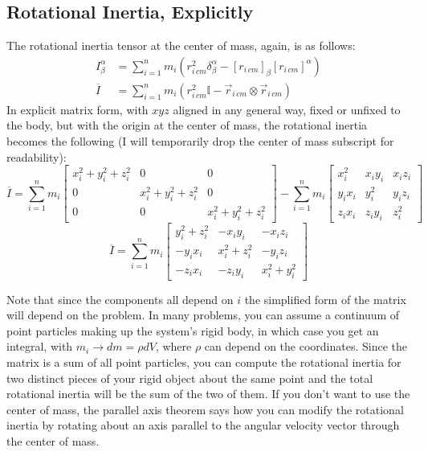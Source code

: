 \documentclass[10pt]{article}
\begin{document}
\subsection{Rotational Inertia, Explicitly}

The rotational inertia tensor at the center of mass, again, is as follows:
\begin{align*}
    I^\alpha_\beta &= \sum_{i=1}^n m_i(r^2_{i\,cm}\delta^\alpha_\beta - 
            [r_{i\,cm}]_\beta[r_{i\,cm}]^\alpha) \\
    \overline{I} &= \sum_{i=1}^n m_i (r^2_{i\,cm}\mathbb{I} - 
        \vec{r}_{i\,cm}\otimes\vec{r}_{i\,cm})
\end{align*}
In explicit matrix form, with $xyz$ aligned in any general way, fixed or 
unfixed to the body, but with the origin at the center of mass, the 
rotational inertia becomes the following (I will temporarily drop 
the center of mass subscript for readability):
\[
\overline{I} = \sum_{i=1}^n m_i
\begin{bmatrix}
    x^2_i + y^2_i + z^2_i & 0 & 0 \\
    0 & x^2_i+ y^2_i+ z^2_i & 0 \\
    0 & 0 & x^2_i+ y^2_i+ z^2_i
\end{bmatrix}
- 
\sum_{i=1}^n m_i
\begin{bmatrix}
    x^2_i & x_iy_i & x_iz_i \\
    y_ix_i & y^2_i & y_iz_i \\
    z_ix_i & z_iy_i &  z^2_i
\end{bmatrix}
\]
\[    
\overline{I} = \sum_{i=1}^n m_i
\begin{bmatrix}
    y^2_i + z^2_i & -x_iy_i & -x_iz_i \\
    -y_ix_i & x^2_i + z^2_i & -y_iz_i \\
    -z_ix_i & -z_iy_i  &  x^2_i + y^2_i
\end{bmatrix}
\]

Note that since the 
components all depend on $i$ the simplified form of the matrix will 
depend on the problem. In many problems, you can assume a 
continuum of point particles making up the system's rigid body, in which 
case you get an integral, with $m_i \rightarrow dm = \rho dV$, where 
$\rho$ can depend on the coordinates. Since the matrix is 
a sum of all point particles, you can compute the rotational 
inertia for two distinct pieces of your rigid object about the same point 
and the total rotational inertia will be the sum of the two of them.
If you don't want to use the center of mass, the parallel axis theorem 
says how you can modify the rotational inertia by rotating about 
an axis parallel to the angular velocity vector through the center of mass.
\end{document}
